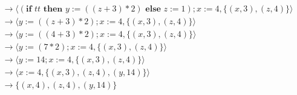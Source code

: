 \documentclass[12pt]{article}
\begin{document}
\begin{enumerate}
\begin{enumerate}
\[\begin{array}{l}
          \rightarrow \langle (\textbf{if } tt \textbf{ then } y := ((z+3)*2) \textbf{ else } z := 1); x := 4, \{(x,3),(z,4)\} \rangle\\
          \rightarrow \langle y := ((z+3)*2); x := 4, \{(x,3),(z,4)\} \rangle\\
          \rightarrow \langle y := ((4+3)*2); x := 4, \{(x,3),(z,4)\} \rangle\\
          \rightarrow \langle y := (7*2); x := 4, \{(x,3),(z,4)\} \rangle\\
          \rightarrow \langle y := 14; x := 4, \{(x,3),(z,4)\} \rangle\\
          \rightarrow \langle x := 4, \{(x,3),(z,4),(y,14)\} \rangle\\
          \rightarrow \{(x,4),(z,4),(y,14)\} \\
        \end{array}
      \]
    \end{enumerate}
\end{enumerate}
\end{document}
